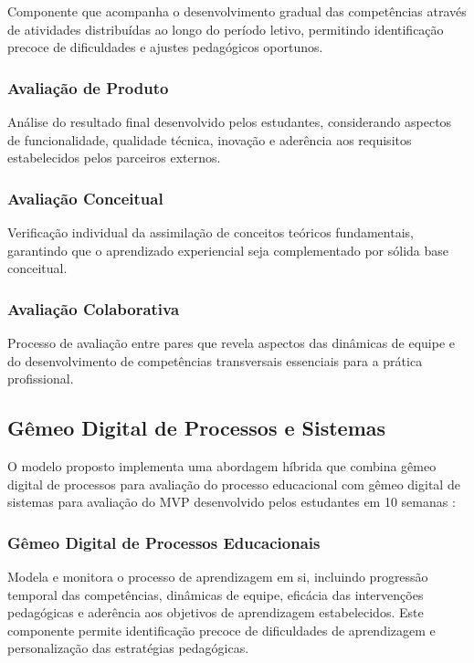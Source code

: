 \documentclass[12pt,a4paper]{article}
\begin{document}
Componente que acompanha o desenvolvimento gradual das competências através de atividades distribuídas ao longo do período letivo, permitindo identificação precoce de dificuldades e ajustes pedagógicos oportunos.

\subsubsection{Avaliação de Produto}

Análise do resultado final desenvolvido pelos estudantes, considerando aspectos de funcionalidade, qualidade técnica, inovação e aderência aos requisitos estabelecidos pelos parceiros externos.

\subsubsection{Avaliação Conceitual}

Verificação individual da assimilação de conceitos teóricos fundamentais, garantindo que o aprendizado experiencial seja complementado por sólida base conceitual.

\subsubsection{Avaliação Colaborativa}

Processo de avaliação entre pares que revela aspectos das dinâmicas de equipe e do desenvolvimento de competências transversais essenciais para a prática profissional.

\subsection{Gêmeo Digital de Processos e Sistemas}

O modelo proposto implementa uma abordagem híbrida que combina gêmeo digital de processos para avaliação do processo educacional com gêmeo digital de sistemas para avaliação do MVP desenvolvido pelos estudantes em 10 semanas \cite{barricelli2019}:

\subsubsection{Gêmeo Digital de Processos Educacionais}

Modela e monitora o processo de aprendizagem em si, incluindo progressão temporal das competências, dinâmicas de equipe, eficácia das intervenções pedagógicas e aderência aos objetivos de aprendizagem estabelecidos. Este componente permite identificação precoce de dificuldades de aprendizagem e personalização das estratégias pedagógicas.
\end{document}
